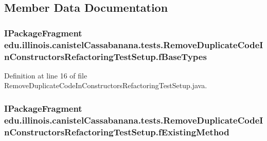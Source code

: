 \subsection{Member Data Documentation}
\hypertarget{classedu_1_1illinois_1_1canistelCassabanana_1_1tests_1_1RemoveDuplicateCodeInConstructorsRefactoringTestSetup_a6c6ee1308a16ef2cbdd1a66605a4fbfa}{
\subsubsection[{fBaseTypes}]{\setlength{\rightskip}{0pt plus 5cm}IPackageFragment {\bf edu.illinois.canistelCassabanana.tests.RemoveDuplicateCodeInConstructorsRefactoringTestSetup.fBaseTypes}}}
\label{classedu_1_1illinois_1_1canistelCassabanana_1_1tests_1_1RemoveDuplicateCodeInConstructorsRefactoringTestSetup_a6c6ee1308a16ef2cbdd1a66605a4fbfa}


Definition at line 16 of file RemoveDuplicateCodeInConstructorsRefactoringTestSetup.java.

\hypertarget{classedu_1_1illinois_1_1canistelCassabanana_1_1tests_1_1RemoveDuplicateCodeInConstructorsRefactoringTestSetup_a220aede9c7539af9e2ebef07cbf6ab53}{
\subsubsection[{fExistingMethod}]{\setlength{\rightskip}{0pt plus 5cm}IPackageFragment {\bf edu.illinois.canistelCassabanana.tests.RemoveDuplicateCodeInConstructorsRefactoringTestSetup.fExistingMethod}}}
\label{classedu_1_1illinois_1_1canistelCassabanana_1_1tests_1_1RemoveDuplicateCodeInConstructorsRefactoringTestSetup_a220aede9c7539af9e2ebef07cbf6ab53}


